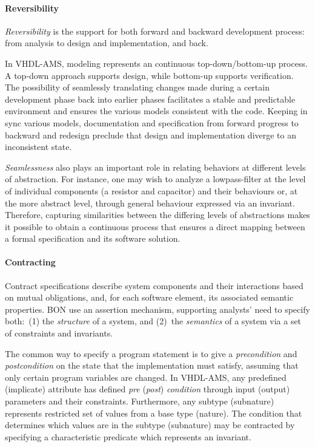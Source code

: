 \documentclass{article}
\begin{document}
\paragraph{Reversibility} \emph{Reversibility} is the support for both
forward and backward development process: from analysis to design and
implementation, and back.

In VHDL-AMS, modeling represents an continuous top-down/bottom-up
process.  A top-down approach supports design, while bottom-up
supports verification.  The possibility of seamlessly translating
changes made during a certain development phase back into earlier
phases facilitates a stable and predictable environment and ensures
the various models consistent with the code.  Keeping in sync various
models, documentation and specification from forward progress to
backward and redesign preclude that design and implementation diverge
to an inconsistent state.

\emph{Seamlessness} also plays an important role in relating behaviors
at different levels of abstraction.  For instance, one may wish to
analyze a lowpass-filter at the level of individual components (a
resistor and capacitor) and their behaviours or, at the more abstract
level, through general behaviour expressed via an invariant.
Therefore, capturing similarities between the differing levels of
abstractions makes it possible to obtain a continuous process that
ensures a direct mapping between a formal specification and its
software solution.

\paragraph{Contracting} Contract specifications describe system
components and their interactions based on mutual obligations, and,
for each software element, its associated semantic properties.  BON
use an assertion mechanism, supporting analysts' need to specify
both:~(1) the \emph{structure} of a system, and (2)~the
\emph{semantics} of a system via a set of constraints and invariants.

The common way to specify a program statement is to give a
\emph{precondition} and \emph{postcondition} on the state that the
implementation must satisfy, assuming that only certain program
variables are changed.  In VHDL-AMS, any predefined (implicate)
attribute has defined \emph{pre} (\emph{post}) \emph{condition}
through input (output) parameters and their constraints.  Furthermore,
any subtype (subnature) represents restricted set of values from a
base type (nature).  The condition that determines which values are in
the subtype (subnature) may be contracted by specifying a
characteristic predicate which represents an invariant.
\end{document}
